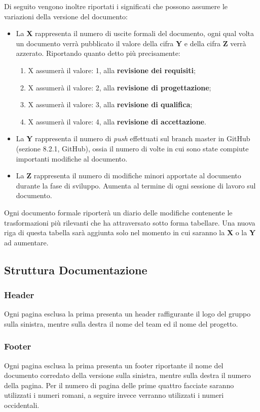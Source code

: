 Di seguito vengono inoltre riportati i significati che possono assumere le variazioni della versione del documento:
\begin{itemize}
\item La \textbf{X} rappresenta il numero di uscite formali del documento, ogni qual volta un documento verrà pubblicato il valore della cifra \textbf{Y} e della cifra \textbf{Z} verrà azzerato. Riportando quanto detto più precisamente:
\begin{enumerate}
\item X assumerà il valore: 1, alla \textbf{revisione dei requisiti};
\item X assumerà il valore: 2, alla \textbf{revisione di progettazione};
\item X assumerà il valore: 3, alla \textbf{revisione di qualifica};
\item X assumerà il valore: 4, alla \textbf{revisione di accettazione}.
\end{enumerate}
\item La \textbf{Y} rappresenta il numero di \textit{push} effettuati sul branch master in GitHub (sezione 8.2.1, GitHub), ossia il numero di volte in cui sono state compiute importanti modifiche al documento.
\item La \textbf{Z} rappresenta il numero di modifiche minori apportate al documento durante la fase di sviluppo.
Aumenta al termine di ogni sessione di lavoro sul documento.
\end{itemize}

Ogni documento formale riporterà un diario delle modifiche contenente le trasformazioni più rilevanti che ha attraversato sotto forma tabellare.
Una nuova riga di questa tabella sarà aggiunta solo nel momento in cui saranno la \textbf{X} o la \textbf{Y} ad aumentare.

\subsection{Struttura Documentazione}
\subsubsection{Header}
Ogni pagina esclusa la prima presenta un header raffigurante il logo del gruppo sulla sinistra, mentre sulla destra il nome del team ed il nome del progetto.
\subsubsection{Footer}
Ogni pagina esclusa la prima presenta un footer riportante il nome del documento corredato della versione sulla sinistra, mentre sulla destra il numero della pagina.
Per il numero di pagina delle prime quattro facciate saranno utilizzati i numeri romani, a seguire invece verranno utilizzati i numeri occidentali.
